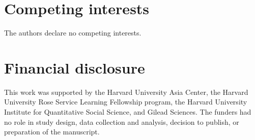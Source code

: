 \documentclass{article}
\begin{document}
\section*{Competing interests}

The authors declare no competing interests.

\section*{Financial disclosure}

This work was supported by the Harvard University Asia Center, the Harvard University Rose Service Learning Fellowship program, the Harvard University Institute for Quantitative Social Science, and Gilead Sciences. The funders had no role in study design, data collection and analysis, decision to publish, or preparation of the manuscript.
\end{document}
